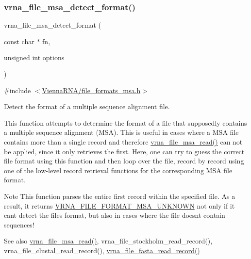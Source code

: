 \mbox{\label{group__file__utils_ga627ac281b5f11c63861726e6472626c9}} 
\subsubsection{\texorpdfstring{vrna\+\_\+file\+\_\+msa\+\_\+detect\+\_\+format()}{vrna\_file\_msa\_detect\_format()}}
{\footnotesize\ttfamily vrna\+\_\+file\+\_\+msa\+\_\+detect\+\_\+format (\begin{DoxyParamCaption}\item[{const char $\ast$}]{fn,  }\item[{unsigned int}]{options }\end{DoxyParamCaption})}



{\ttfamily \#include $<$\hyperlink{file__formats__msa_8h}{Vienna\+R\+N\+A/file\+\_\+formats\+\_\+msa.\+h}$>$}



Detect the format of a multiple sequence alignment file. 

This function attempts to determine the format of a file that supposedly contains a multiple sequence alignment (M\+SA). This is useful in cases where a M\+SA file contains more than a single record and therefore \hyperlink{group__file__utils_ga08a01c40ac5f5e0e04e9ae2258c99aa6}{vrna\+\_\+file\+\_\+msa\+\_\+read()} can not be applied, since it only retrieves the first. Here, one can try to guess the correct file format using this function and then loop over the file, record by record using one of the low-\/level record retrieval functions for the corresponding M\+SA file format.

\begin{DoxyNote}{Note}
This function parses the entire first record within the specified file. As a result, it returns \hyperlink{group__file__utils_gabdc948f547e550125de3e7c65878400c}{V\+R\+N\+A\+\_\+\+F\+I\+L\+E\+\_\+\+F\+O\+R\+M\+A\+T\+\_\+\+M\+S\+A\+\_\+\+U\+N\+K\+N\+O\+WN} not only if it can\textquotesingle{}t detect the file\textquotesingle{}s format, but also in cases where the file doesn\textquotesingle{}t contain sequences!
\end{DoxyNote}
\begin{DoxySeeAlso}{See also}
\hyperlink{group__file__utils_ga08a01c40ac5f5e0e04e9ae2258c99aa6}{vrna\+\_\+file\+\_\+msa\+\_\+read()}, vrna\+\_\+file\+\_\+stockholm\+\_\+read\+\_\+record(), vrna\+\_\+file\+\_\+clustal\+\_\+read\+\_\+record(), \hyperlink{group__file__utils_ga8cfb7e271efc9e1f34640acb85475639}{vrna\+\_\+file\+\_\+fasta\+\_\+read\+\_\+record()}
\end{DoxySeeAlso}

